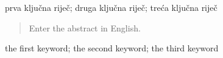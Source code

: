 \documentclass[times, utf8, diplomskirad]{fer}
\begin{document}
\begin{kljucnerijeci}
  prva ključna riječ; druga ključna riječ; treća ključna riječ
\end{kljucnerijeci}


\begin{abstract}
  Enter the abstract in English.
  
\end{abstract}

\begin{keywords}
  the first keyword; the second keyword; the third keyword
\end{keywords}



\backmatter
\end{document}
